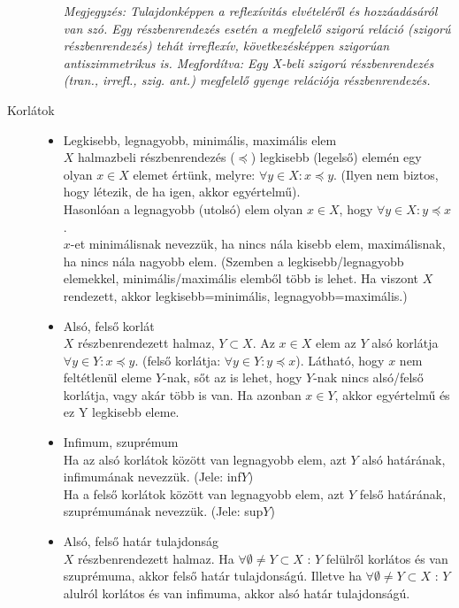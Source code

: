 \documentclass[margin=0px]{article}
\begin{document}
\begin{description}
\begin{itemize}
							\textit{Megjegyzés: Tulajdonképpen a reflexívitás elvételéről és hozzáadásáról van szó. Egy részbenrendezés esetén a megfelelő szigorú reláció (szigorú részbenrendezés) tehát irreflexív, következésképpen szigorúan antiszimmetrikus is. Megfordítva: Egy X-beli szigorú részbenrendezés (tran., irrefl., szig. ant.) megfelelő gyenge relációja részbenrendezés. }
					\end{itemize}
				\item[Korlátok] \hfill 
					\begin{itemize}
						\item Legkisebb, legnagyobb, minimális, maximális elem \\
							$X$ halmazbeli részbenrendezés ($\preccurlyeq$) legkisebb (legelső) elemén egy olyan $x\in X$ elemet értünk, melyre: $\forall y \in X : x\preccurlyeq y$. (Ilyen nem biztos, hogy létezik, de ha igen, akkor egyértelmű).\\
							Hasonlóan a legnagyobb (utolsó) elem olyan $x\in X$, hogy $\forall y \in X : y \preccurlyeq x$.\\
							
							$x$-et minimálisnak nevezzük, ha nincs nála kisebb elem, maximálisnak, ha nincs nála nagyobb elem. (Szemben a legkisebb/legnagyobb elemekkel, minimális/maximális elemből több is lehet. Ha viszont $X$ rendezett, akkor legkisebb=minimális, legnagyobb=maximális.)
						\item Alsó, felső korlát \\
							$X$ részbenrendezett halmaz, $Y \subset X$. Az $x \in X$ elem az $Y$ alsó korlátja $\forall y \in Y : x \preccurlyeq y$. (felső korlátja: $\forall y \in Y : y \preccurlyeq x$). Látható, hogy $x$ nem feltétlenül eleme $Y$-nak, sőt az is lehet, hogy $Y$-nak nincs alsó/felső korlátja, vagy akár több is van. Ha azonban $x\in Y$, akkor egyértelmű és ez Y legkisebb eleme.
						\item Infimum, szuprémum \\
							Ha az alsó korlátok között van legnagyobb elem, azt $Y$ alsó határának, infimumának nevezzük. (Jele: inf$Y$) \\
							Ha a felső korlátok között van legnagyobb elem, azt $Y$ felső határának, szuprémumának nevezzük. (Jele: sup$Y$)
						\item Alsó, felső határ tulajdonság \\
							$X$ részbenrendezett halmaz. Ha $ \forall \emptyset \neq Y \subset X$ : $Y$ felülről korlátos és van szuprémuma, akkor felső határ tulajdonságú.
							Illetve ha $ \forall \emptyset \neq Y \subset X$ : $Y$ alulról korlátos és van infimuma, akkor alsó határ tulajdonságú.
					\end{itemize}
			\end{description}
\end{document}
